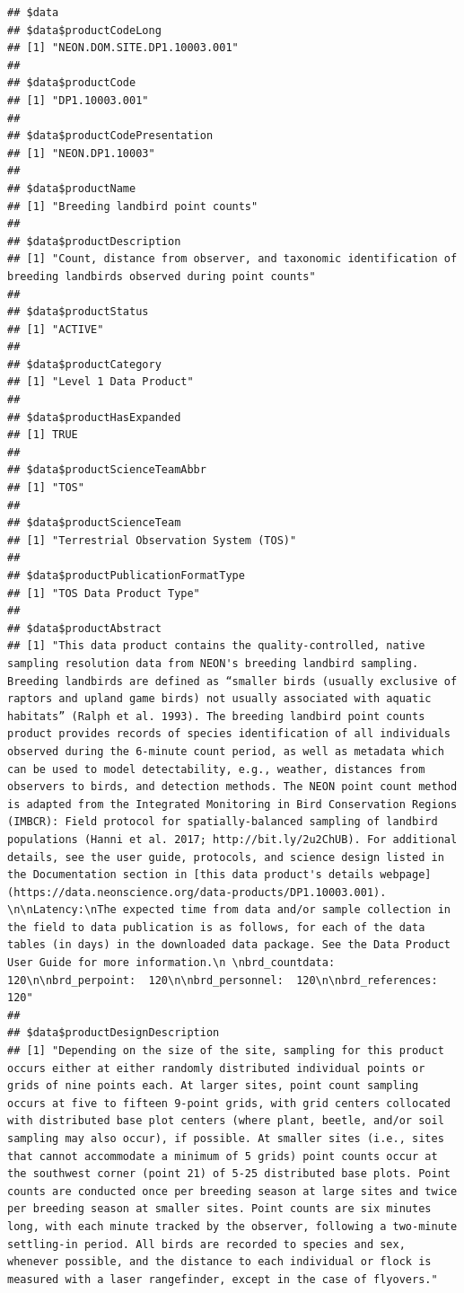\documentclass[]{book}
\begin{document}
\begin{verbatim}
## $data
## $data$productCodeLong
## [1] "NEON.DOM.SITE.DP1.10003.001"
## 
## $data$productCode
## [1] "DP1.10003.001"
## 
## $data$productCodePresentation
## [1] "NEON.DP1.10003"
## 
## $data$productName
## [1] "Breeding landbird point counts"
## 
## $data$productDescription
## [1] "Count, distance from observer, and taxonomic identification of breeding landbirds observed during point counts"
## 
## $data$productStatus
## [1] "ACTIVE"
## 
## $data$productCategory
## [1] "Level 1 Data Product"
## 
## $data$productHasExpanded
## [1] TRUE
## 
## $data$productScienceTeamAbbr
## [1] "TOS"
## 
## $data$productScienceTeam
## [1] "Terrestrial Observation System (TOS)"
## 
## $data$productPublicationFormatType
## [1] "TOS Data Product Type"
## 
## $data$productAbstract
## [1] "This data product contains the quality-controlled, native sampling resolution data from NEON's breeding landbird sampling. Breeding landbirds are defined as “smaller birds (usually exclusive of raptors and upland game birds) not usually associated with aquatic habitats” (Ralph et al. 1993). The breeding landbird point counts product provides records of species identification of all individuals observed during the 6-minute count period, as well as metadata which can be used to model detectability, e.g., weather, distances from observers to birds, and detection methods. The NEON point count method is adapted from the Integrated Monitoring in Bird Conservation Regions (IMBCR): Field protocol for spatially-balanced sampling of landbird populations (Hanni et al. 2017; http://bit.ly/2u2ChUB). For additional details, see the user guide, protocols, and science design listed in the Documentation section in [this data product's details webpage](https://data.neonscience.org/data-products/DP1.10003.001). \n\nLatency:\nThe expected time from data and/or sample collection in the field to data publication is as follows, for each of the data tables (in days) in the downloaded data package. See the Data Product User Guide for more information.\n \nbrd_countdata:  120\n\nbrd_perpoint:  120\n\nbrd_personnel:  120\n\nbrd_references:  120"
## 
## $data$productDesignDescription
## [1] "Depending on the size of the site, sampling for this product occurs either at either randomly distributed individual points or grids of nine points each. At larger sites, point count sampling occurs at five to fifteen 9-point grids, with grid centers collocated with distributed base plot centers (where plant, beetle, and/or soil sampling may also occur), if possible. At smaller sites (i.e., sites that cannot accommodate a minimum of 5 grids) point counts occur at the southwest corner (point 21) of 5-25 distributed base plots. Point counts are conducted once per breeding season at large sites and twice per breeding season at smaller sites. Point counts are six minutes long, with each minute tracked by the observer, following a two-minute settling-in period. All birds are recorded to species and sex, whenever possible, and the distance to each individual or flock is measured with a laser rangefinder, except in the case of flyovers."

\end{verbatim}
\end{document}
